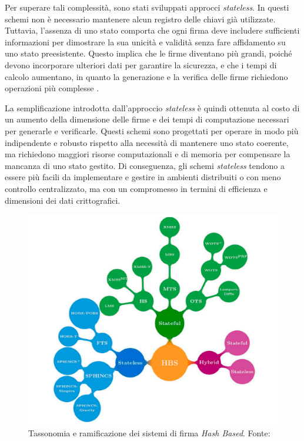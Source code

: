 Per superare tali complessità, sono stati sviluppati approcci \textit{stateless}. In questi schemi non è necessario mantenere alcun registro delle chiavi già utilizzate. Tuttavia, l'assenza di uno stato comporta che ogni firma deve includere sufficienti informazioni per dimostrare la sua unicità e validità senza fare affidamento su uno stato preesistente. Questo implica che le firme diventano più grandi, poiché devono incorporare ulteriori dati per garantire la sicurezza, e che i tempi di calcolo aumentano, in quanto la generazione e la verifica delle firme richiedono operazioni più complesse \cite{iot-hashbasedpqc}.

La semplificazione introdotta dall'approccio \textit{stateless} è quindi ottenuta al costo di un aumento della dimensione delle firme e dei tempi di computazione necessari per generarle e verificarle. Questi schemi sono progettati per operare in modo più indipendente e robusto rispetto alla necessità di mantenere uno stato coerente, ma richiedono maggiori risorse computazionali e di memoria per compensare la mancanza di uno stato gestito. Di conseguenza, gli schemi \textit{stateless} tendono a essere più facili da implementare e gestire in ambienti distribuiti o con meno controllo centralizzato, ma con un compromesso in termini di efficienza e dimensioni dei dati crittografici.

\begin{figure}[H]
    \centering
    \includegraphics[width=1\textwidth]{Immagini/20240909_HBS.png}
    \caption{Tassonomia e ramificazione dei sistemi di firma \textit{Hash Based}. Fonte: \cite{iot-hashbasedpqc}}
\end{figure}